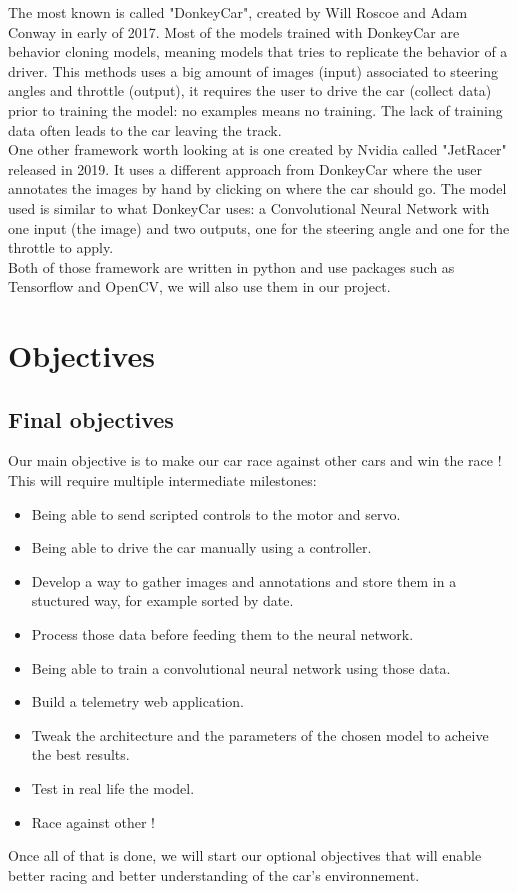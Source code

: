 \documentclass[12pt]{article}
\begin{document}
The most known is called "DonkeyCar", created by Will Roscoe and Adam Conway in early of 2017. Most of the models trained with DonkeyCar are behavior cloning models, meaning models that tries to replicate the behavior of a driver. This methods uses a big amount of images (input) associated to steering angles and throttle (output), it requires the user to drive the car (collect data) prior to training the model: no examples means no training. The lack of training data often leads to the car leaving the track.\\

One other framework worth looking at is one created by Nvidia called "JetRacer" released in 2019. It uses a different approach from DonkeyCar where the user annotates the images by hand by clicking on where the car should go. The model used is similar to what DonkeyCar uses: a Convolutional Neural Network with one input (the image) and two outputs, one for the steering angle and one for the throttle to apply. \\

Both of those framework are written in python and use packages such as Tensorflow and OpenCV, we will also use them in our project.

\section{Objectives}

\subsection{Final objectives}
Our main objective is to make our car race against other cars and win the race !
This will require multiple intermediate milestones:
\begin{itemize}
\item Being able to send scripted controls to the motor and servo.
\item Being able to drive the car manually using a controller.
\item Develop a way to gather images and annotations and store them in a stuctured way, for example sorted by date.
\item Process those data before feeding them to the neural network.
\item Being able to train a convolutional neural network using those data.
\item Build a telemetry web application.
\item Tweak the architecture and the parameters of the chosen model to acheive the best results.
\item Test in real life the model.
\item Race against other !
\end{itemize}
Once all of that is done, we will start our optional objectives that will enable better racing and better understanding of the car's environnement.
\end{document}
